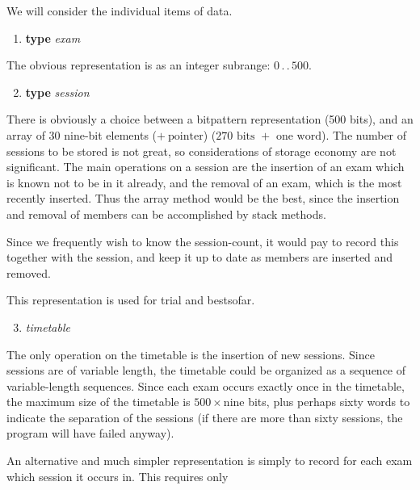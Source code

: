 We will consider the individual items of data.

\begin{enumerate}[leftmargin=2\parindent, label=(\arabic*)]
	\item \textbf{type} \textit{exam}
\end{enumerate}

\noindent
The obvious representation is as an integer subrange: $0\,.\,.\,500$.

\begin{enumerate}[leftmargin=2\parindent, label=(\arabic*)]
	\setcounter{enumi}{1}
	\item \textbf{type} \textit{session}
\end{enumerate}

\noindent
There is obviously a choice between a bitpattern representation (500 bits), and an array of 30 nine-bit elements ($+\ \text{pointer}$) ($270 \text{ bits } + \text{ one word}$). The number of sessions to be stored is not great, so considerations of storage  economy are not significant. The main operations on a session are the insertion of an exam which is known not to be in it already, and the removal of an exam, which is the most recently inserted. Thus the array method would be the best, since the insertion and removal of members can be accomplished by stack methods.

Since we frequently wish to know the session-count, it would pay to record this together with the session, and keep it up to date as members are inserted and removed.

This representation is used for trial and bestsofar.

\begin{enumerate}[leftmargin=2\parindent, label=(\arabic*)]
	\setcounter{enumi}{2}
	\item \textit{timetable}
\end{enumerate}

\noindent
The only operation on the timetable is the insertion of new sessions. Since sessions are of variable length, the timetable could be organized as a sequence of variable-length sequences. Since each exam occurs exactly once in the timetable, the maximum size of the timetable is $500 \times \text{nine}$ bits, plus perhaps sixty words to indicate the separation of the sessions (if there are more than sixty sessions, the program will have failed anyway).

An alternative and much simpler representation is simply to record for each exam which session it occurs in. This requires only


